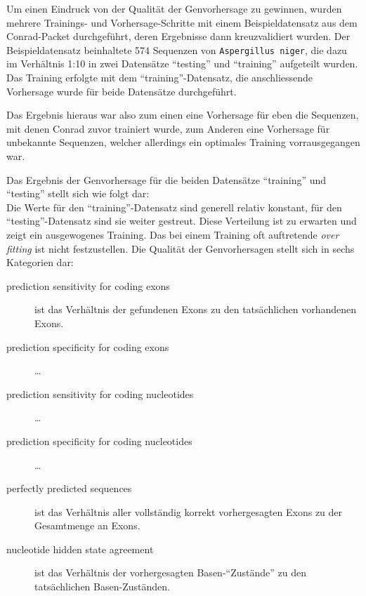 Um einen Eindruck von der Qualität der Genvorhersage zu gewinnen, wurden
mehrere Trainings- und Vorhersage-Schritte mit einem Beispieldatensatz aus dem
Conrad-Packet durchgeführt, deren Ergebnisse dann kreuzvalidiert wurden.
Der Beispieldatensatz beinhaltete 574 Sequenzen von \texttt{Aspergillus niger},
die dazu im Verhältnis 1:10 in zwei Datensätze \enquote{testing} und
\enquote{training} aufgeteilt wurden. Das Training erfolgte mit dem
\enquote{training}-Datensatz, die anschliessende Vorhersage wurde für beide
Datensätze durchgeführt.

Das Ergebnis hieraus war also zum einen eine Vorhersage für eben die Sequenzen,
mit denen Conrad zuvor trainiert wurde, zum Anderen eine Vorhersage für unbekannte
Sequenzen, welcher allerdings ein optimales Training vorrausgegangen war.

Das Ergebnis der Genvorhersage für die beiden Datensätze \enquote{training} und
\enquote{testing} stellt sich wie folgt dar:\\
Die Werte für den \enquote{training}-Datensatz sind generell relativ konstant,
für den \enquote{testing}-Datensatz sind sie weiter gestreut.
Diese Verteilung ist zu erwarten und zeigt ein ausgewogenes Training.
Das bei einem Training oft auftretende \textit{over fitting} ist nicht
festzustellen.
Die Qualität der Genvorhersagen stellt sich in sechs Kategorien dar:
\begin{description}
\item[prediction sensitivity for coding exons] ist das Verhältnis
der gefundenen Exons zu den tatsächlichen vorhandenen Exons.
\item[prediction specificity for coding exons] \ldots
\item[prediction sensitivity for coding nucleotides] \ldots
\item[prediction specificity for coding nucleotides] \ldots
\item[perfectly predicted sequences] ist das Verhältnis aller
vollständig korrekt vorhergesagten Exons zu der Gesamtmenge an Exons.
\item[nucleotide hidden state agreement] ist das Verhältnis der vorhergesagten
Basen-\enquote{Zustände} zu den tatsächlichen Basen-Zuständen.
\end{description}


